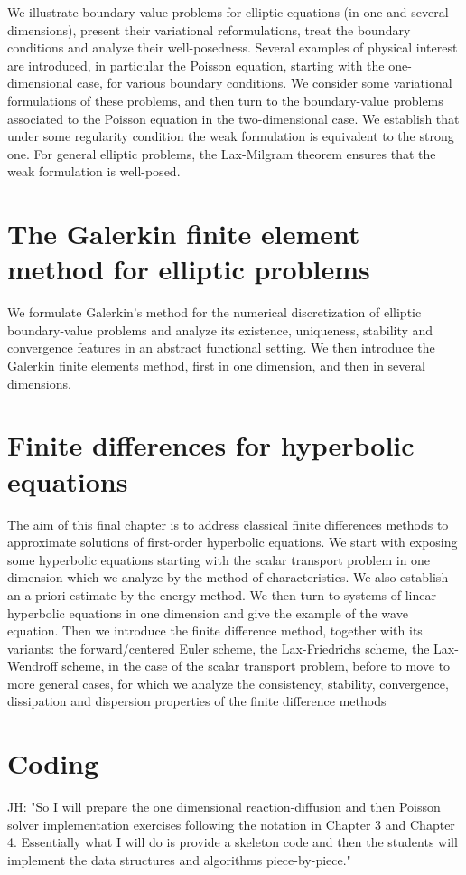\documentclass{article}
\begin{document}
We illustrate boundary-value problems for elliptic equations (in one
and several dimensions), present their variational reformulations, treat the boundary conditions and analyze their well-posedness. Several examples of physical interest are
introduced, in particular the Poisson equation, starting with the one-dimensional case, for various boundary conditions. We consider some variational formulations of these problems, and then turn to the boundary-value problems associated to the Poisson
equation in the two-dimensional case. We establish that under some regularity condition the weak formulation is equivalent to the strong one. 
For general elliptic problems, the Lax-Milgram theorem  ensures that the weak formulation is well-posed. 

\section{The Galerkin finite element method for elliptic problems}

 We formulate Galerkin’s method
for the numerical discretization of elliptic boundary-value problems and analyze its existence, uniqueness, stability and convergence features  in
an abstract functional setting. We then introduce the Galerkin finite elements method, first in one
dimension,  and then in several dimensions.

\section{Finite differences for hyperbolic equations}

 The aim of this final chapter is to address classical finite differences  methods to  approximate solutions of first-order hyperbolic equations. 
We start with exposing some hyperbolic equations starting with the 
scalar transport problem in one dimension which we analyze by the method of characteristics. We also establish an a priori estimate by the energy method. We then turn to systems of linear hyperbolic equations in one dimension and give the example of  the wave equation. 
Then we introduce the finite difference method, together with its variants: the forward/centered Euler scheme, the Lax-Friedrichs scheme, the Lax-Wendroff scheme, in the case of the scalar transport problem, before to move to more general cases, for which we analyze the consistency, stability, convergence, dissipation and dispersion
properties  of the finite difference methods 

\section{Coding}

JH: "So I will prepare the one dimensional reaction-diffusion and then Poisson solver implementation exercises following the notation in Chapter 3 and Chapter 4. Essentially what I will do is provide a skeleton code and then the students will implement the data structures and algorithms piece-by-piece."

    
    
\end{document}
